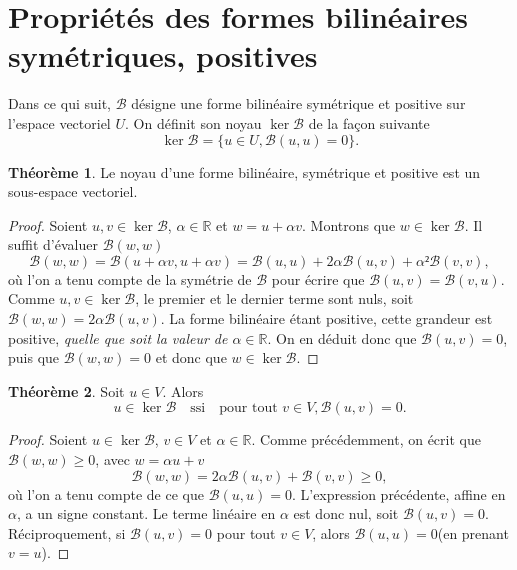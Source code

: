 \documentclass[12pt, final]{scrartcl}
\theoremstyle{definition}
\newtheorem{theorem}{Théorème}
\newcommand{\reals}{\mathbb{R}}
\begin{document}
\section{Propriétés des formes bilinéaires symétriques, positives}

Dans ce qui suit, \(\mathcal{B}\) désigne une forme bilinéaire symétrique et
positive sur l'espace vectoriel \(U\). On définit son noyau \(\ker \mathcal{B}\)
de la façon suivante
\begin{equation}
 \ker \mathcal{B}= \bigl\{ u ∈ U, \mathcal{B}(u, u) = 0 \bigr\} .
\end{equation}

\begin{theorem}
  Le noyau d'une forme bilinéaire, symétrique et positive est un sous-espace
  vectoriel.
\end{theorem}
\begin{proof}
  Soient \(u, v∈\ker \mathcal{B}\), \(α∈\reals\) et \(w = u + α v\). Montrons
  que \(w ∈ \ker\mathcal{B}\). Il suffit d'évaluer \(\mathcal{B}(w, w)\)
 \begin{equation}
   \mathcal{B}(w, w) = \mathcal{B}(u + α v, u + α v)
   = \mathcal{B}(u, u) + 2 α \mathcal{B}(u, v) + α² \mathcal{B}(v, v),
 \end{equation}
 où l'on a tenu compte de la symétrie de \(\mathcal{B}\) pour écrire que
 \(\mathcal{B}(u, v) =\mathcal{B}(v, u)\). Comme \(u, v ∈ \ker\mathcal{B}\), le
 premier et le dernier terme sont nuls, soit
 \(\mathcal{B}(w, w) = 2α \mathcal{B}(u, v)\). La forme bilinéaire étant
 positive, cette grandeur est positive, \emph{quelle que soit la valeur de
   \(α∈\reals\)}. On en déduit donc que \(\mathcal{B}(u, v) = 0\), puis que
 \(\mathcal{B}(w, w) = 0\) et donc que \(w ∈ \ker\mathcal{B}\).
\end{proof}

\begin{theorem}
 Soit \(u∈V\). Alors
 \begin{equation}
  u ∈ \ker\mathcal{B} \quad \text{ssi} \quad \text{pour tout } v ∈ V, \mathcal{B}(u, v) = 0.
 \end{equation}
\end{theorem}

\begin{proof}
  Soient \(u∈\ker \mathcal{B}\), \(v∈V\) et \(α∈\reals\). Comme précédemment, on
  écrit que \(\mathcal{B}(w, w) ≥ 0\), avec \(w = α u + v\)
 \begin{equation}
  \mathcal{B}(w, w) = 2 α \mathcal{B}(u, v) +\mathcal{B}(v, v) \geq
  0,
 \end{equation}
 où l'on a tenu compte de ce que \(\mathcal{B}(u, u) = 0\). L'expression
 précédente, affine en \(α\), a un signe constant. Le terme linéaire en \(α\)
 est donc nul, soit \(\mathcal{B}(u, v) = 0\).  Réciproquement, si
 \(\mathcal{B}(u, v) = 0\) pour tout \(v∈V\), alors \(\mathcal{B}(u, u) = 0\)(en
 prenant \(v = u\)).
\end{proof}
\end{document}
